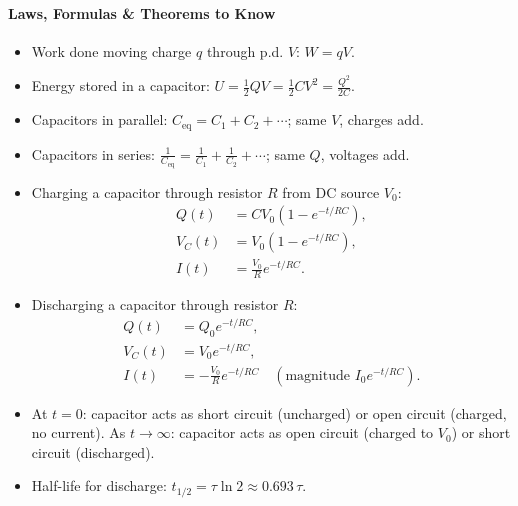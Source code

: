 \documentclass[11pt]{article}
\newcommand{\cle}[1]{{\popxbold\color{popdark}#1}}
\begin{document}
\begin{bilan}
\paragraph{Laws, Formulas \& Theorems to Know}
\begin{itemize}
  \item Work done moving charge $q$ through p.d. $V$: $W = qV$.
  \item Energy stored in a capacitor: $U = \frac{1}{2}QV = \frac{1}{2}CV^2 = \frac{Q^2}{2C}$.
  \item Capacitors in \cle{parallel}: $C_{\text{eq}} = C_1 + C_2 + \cdots$; same $V$, charges add.
  \item Capacitors in \cle{series}: $\frac{1}{C_{\text{eq}}} = \frac{1}{C_1} + \frac{1}{C_2} + \cdots$; same $Q$, voltages add.
  \item Charging a capacitor through resistor $R$ from DC source $V_0$:
    \begin{align*}
      Q(t) &= C V_0 \left(1 - e^{-t/RC}\right), \\
      V_C(t) &= V_0 \left(1 - e^{-t/RC}\right), \\
      I(t) &= \frac{V_0}{R} e^{-t/RC}.
    \end{align*}
  \item Discharging a capacitor through resistor $R$:
    \begin{align*}
      Q(t) &= Q_0 e^{-t/RC}, \\
      V_C(t) &= V_0 e^{-t/RC}, \\
      I(t) &= -\frac{V_0}{R} e^{-t/RC} \quad (\text{magnitude } I_0 e^{-t/RC}).
    \end{align*}
  \item At $t=0$: capacitor acts as short circuit (uncharged) or open circuit (charged, no current). As $t\to\infty$: capacitor acts as open circuit (charged to $V_0$) or short circuit (discharged).
  \item Half-life for discharge: $t_{1/2} = \tau \ln 2 \approx 0.693\, \tau$.
\end{itemize}


\end{bilan}
\end{document}
